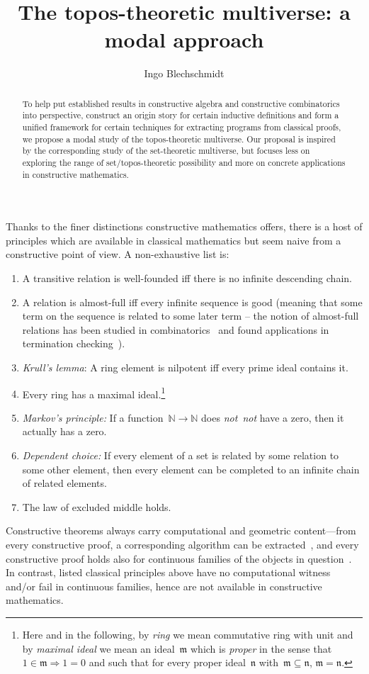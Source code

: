 \documentclass[oneside,reqno]{amsart}
\title{The topos-theoretic multiverse: a modal approach}
\author{Ingo Blechschmidt}
\theoremstyle{definition}
\theoremstyle{plain}
\theoremstyle{remark}
\newcommand{\mmm}{\mathfrak{m}}
\newcommand{\nnn}{\mathfrak{n}}
\newcommand{\NN}{\mathbb{N}}
\renewcommand{\_}{\mathpunct{.}\,}
\newcommand{\notnot}{\emph{not~not}\xspace}
\newcommand{\?}{\,{:}\,}
\begin{document}
\begin{abstract}
  To help put established results in constructive algebra and constructive
  combinatorics into perspective, construct an origin story for certain
  inductive definitions and form a unified framework for certain techniques for
  extracting programs from classical proofs, we propose a modal study of the
  topos-theoretic multiverse. Our proposal is inspired by the corresponding study
  of the set-theoretic multiverse, but focuses less on exploring the range of
  set/topos-theoretic possibility and more on concrete applications in
  constructive mathematics.
\end{abstract}

\maketitle
\thispagestyle{empty}

\noindent
Thanks to the finer distinctions constructive mathematics offers, there is a
host of principles which are available in classical mathematics but seem naive
from a constructive point of view. A non-exhaustive list is:
\begin{enumerate}
\renewcommand{\theenumi}{\arabic{enumi}*}
\item A transitive relation is well-founded iff there is no infinite descending
chain.
\item A relation is almost-full iff every infinite sequence is good (meaning
that some term on the sequence is related to some later term -- the notion
of almost-full relations
has been studied in combinatorics~\cite{xxx} and found applications in
termination checking~\cite{xxx}).
\item \emph{Krull's lemma}: A ring element is nilpotent iff every prime
ideal contains it.
\item Every ring has a maximal ideal.\footnote{Here and in the following, by
\emph{ring} we mean commutative ring with unit and by \emph{maximal ideal} we
mean an ideal~$\mmm$ which is \emph{proper} in the sense that~$1 \in \mmm
\Rightarrow 1 = 0$ and such that for every proper ideal~$\nnn$ with~$\mmm
\subseteq \nnn$, $\mmm = \nnn$.}
\item \emph{Markov's principle:} If a function~$\NN \to \NN$ does \notnot have
a zero, then it actually has a zero.
\item \emph{Dependent choice:} If every element of a set is related by some relation to some other
element, then every element can be completed to an infinite chain of related
elements.
\item The law of excluded middle holds.
\end{enumerate}
Constructive theorems always carry computational and geometric
content---from every constructive proof, a corresponding algorithm can be
extracted~\cite{bauer:c2c}, and every constructive proof holds also for continuous families of
the objects in question~\cite[Section~4.3]{blechschmidt:filmat}. In contrast, listed classical principles above have no
computational witness and/or fail in continuous families, hence are not
available in constructive mathematics.
\end{document}
